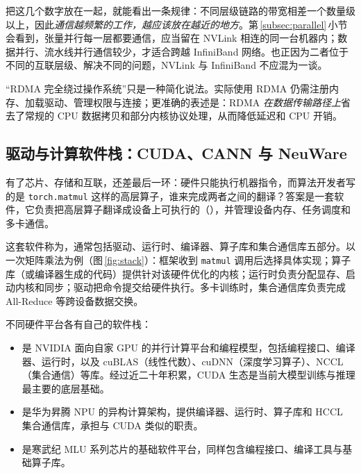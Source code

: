 

把这几个数字放在一起，就能看出一条规律：不同层级链路的带宽相差一个数量级以上，因此\emph{通信越频繁的工作，越应该放在越近的地方}。第\,\ref{subsec:parallel}\,小节会看到，张量并行每一层都要通信，应当留在 NVLink 相连的同一台机器内；数据并行、流水线并行通信较少，才适合跨越 InfiniBand 网络。也正因为二者位于不同的互联层级、解决不同的问题，NVLink 与 InfiniBand 不应混为一谈。

\begin{pitfall}
“RDMA 完全绕过操作系统”只是一种简化说法。实际使用 RDMA 仍需注册内存、加载驱动、管理权限与连接；更准确的表述是：RDMA \emph{在数据传输路径上}省去了常规的 CPU 数据拷贝和部分内核协议处理，从而降低延迟和 CPU 开销。
\end{pitfall}

\subsection{驱动与计算软件栈：CUDA、CANN 与 NeuWare}
\label{subsec:stack}

有了芯片、存储和互联，还差最后一环：硬件只能执行机器指令，而算法开发者写的是 \texttt{torch.matmul} 这样的高层算子，谁来完成两者之间的翻译？答案是一套软件，它负责把高层算子翻译成设备上可执行的（），并管理设备内存、任务调度和多卡通信。

这套软件称为，通常包括驱动、运行时、编译器、算子库和集合通信库五部分。以一次矩阵乘法为例（图\,\ref{fig:stack}）：框架收到 \texttt{matmul} 调用后选择具体实现；算子库（或编译器生成的代码）提供针对该硬件优化的内核；运行时负责分配显存、启动内核和同步；驱动把命令提交给硬件执行。多卡训练时，集合通信库负责完成 All-Reduce 等跨设备数据交换。



不同硬件平台各有自己的软件栈：
\begin{itemize}
  \item {} 是 NVIDIA 面向自家 GPU 的并行计算平台和编程模型，包括编程接口、编译器、运行时，以及 cuBLAS（线性代数）、cuDNN（深度学习算子）、NCCL（集合通信）等库\cite{nvidia2024cuda}。经过近二十年积累，CUDA 生态是当前大模型训练与推理最主要的底层基础。
  \item {} 是华为昇腾 NPU 的异构计算架构，提供编译器、运行时、算子库和 HCCL 集合通信库，承担与 CUDA 类似的职责。
  \item {} 是寒武纪 MLU 系列芯片的基础软件平台，同样包含编程接口、编译工具与基础算子库。
\end{itemize}


